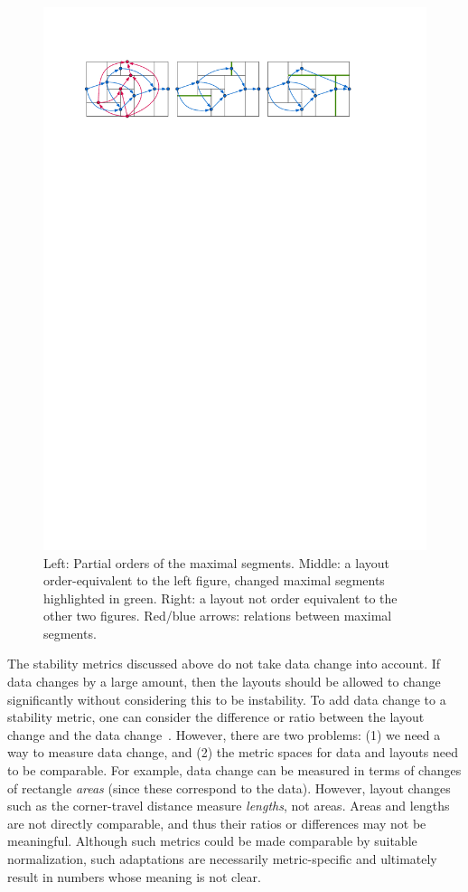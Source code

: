 \begin{figure}[t]
\centering
        \includegraphics[width=\textwidth]{figures/treemap-evaluation/order-equivalent}
    \caption{Left: Partial orders of the maximal segments. Middle: a layout order-equivalent to the left figure, changed maximal segments highlighted in green. Right: a layout not order equivalent to the other two figures. Red/blue arrows: relations between maximal segments.}
     \label{fig:partialOrder}
\end{figure}

%
The stability metrics discussed above do not take data change into account. If data changes by a large amount, then the layouts should be allowed to change significantly without considering this to be instability. To add data change to a stability metric, one can consider the difference or ratio between the layout change and the data change~\citep{vernier18software,vernier18git}.
However, there are two problems: (1) we need a way to measure data change, and (2) the metric spaces for data and layouts need to be comparable. For example, data change can be measured in terms of changes of rectangle \emph{areas} (since these correspond to the data). However, layout changes such as the corner-travel distance measure \emph{lengths}, not areas. Areas and lengths are not directly comparable, and thus their ratios or differences may not be meaningful. 
Although such metrics could be made comparable by suitable normalization, such adaptations are necessarily metric-specific and ultimately result in numbers whose meaning is not clear.%

